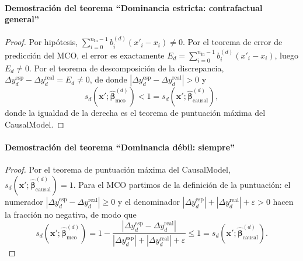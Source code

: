 \documentclass[12pt]{report} %
\begin{document}
\paragraph*{Demostración del teorema ``Dominancia estricta: contrafactual general''}
\begin{proof}
    Por hipótesis, $\sum_{i=0}^{n_{\text{In}}-1} b_i^{(d)} (x'_i - x_i) \neq 0$. Por el teorema de error de predicción del MCO, el error es exactamente $E_d = \sum_{i=0}^{n_{\text{In}}-1} b_i^{(d)} (x'_i - x_i)$, luego $E_d \neq 0$. Por el teorema de descomposición de la discrepancia, $\Delta y_d^{\text{esp}} - \Delta y_d^{\text{real}} = E_d \neq 0$, de donde $|\Delta y_d^{\text{esp}} - \Delta y_d^{\text{real}}| > 0$ y
    $$s_d\!\left(\mathbf{x}'; \widehat{\boldsymbol{\beta}}^{(d)}_{\text{mco}}\right) < 1 = s_d\!\left(\mathbf{x}'; \widehat{\boldsymbol{\beta}}^{(d)}_{\text{causal}}\right),$$
    donde la igualdad de la derecha es el teorema de puntuación máxima del CausalModel.
\end{proof}

\paragraph*{Demostración del teorema ``Dominancia débil: siempre''}
\begin{proof}
    Por el teorema de puntuación máxima del CausalModel, $s_d\!\left(\mathbf{x}'; \widehat{\boldsymbol{\beta}}^{(d)}_{\text{causal}}\right) = 1$. Para el MCO partimos de la definición de la puntuación: el numerador $|\Delta y_d^{\text{esp}} - \Delta y_d^{\text{real}}| \geq 0$ y el denominador $|\Delta y_d^{\text{esp}}| + |\Delta y_d^{\text{real}}| + \varepsilon > 0$ hacen la fracción no negativa, de modo que
    $$s_d\!\left(\mathbf{x}'; \widehat{\boldsymbol{\beta}}^{(d)}_{\text{mco}}\right) = 1 - \frac{|\Delta y_d^{\text{esp}} - \Delta y_d^{\text{real}}|}{|\Delta y_d^{\text{esp}}| + |\Delta y_d^{\text{real}}| + \varepsilon} \leq 1 = s_d\!\left(\mathbf{x}'; \widehat{\boldsymbol{\beta}}^{(d)}_{\text{causal}}\right).$$
\end{proof}
\end{document}

